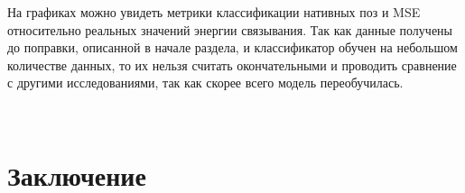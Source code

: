 \documentclass[12pt,twoside]{article}
\begin{document}
На графиках можно увидеть метрики классификации нативных поз и MSE относительно реальных значений энергии связывания. Так как данные получены до поправки, описанной в начале раздела, и классификатор обучен на небольшом количестве данных, то их нельзя считать окончательными и проводить сравнение с другими исследованиями, так как скорее всего модель переобучилась. 

\begin{figure}[H]
	\\
	\label{fg:Example}
\end{figure}

\section{Заключение}
\end{document}
